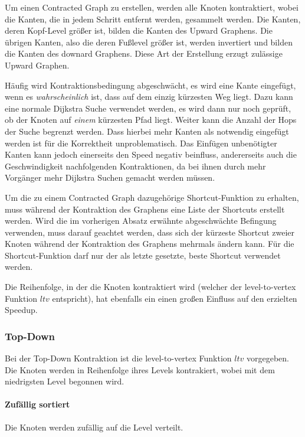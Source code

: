 Um einen Contracted Graph zu erstellen, werden alle Knoten kontraktiert, wobei die Kanten, die in jedem Schritt entfernt werden, gesammelt werden.
Die Kanten, deren Kopf-Level größer ist, bilden die Kanten des Upward Graphens.
Die übrigen Kanten, also die deren Fußlevel größer ist, werden invertiert und bilden die Kanten des downard Graphens.
Diese Art der Erstellung erzugt zulässige Upward Graphen.

Häufig wird Kontraktionsbedingung abgeschwächt, es wird eine Kante eingefügt, wenn es \emph{wahrscheinlich} ist, dass auf dem einzig kürzesten Weg liegt.
Dazu kann eine normale Dijkstra Suche verwendet werden, es wird dann nur noch geprüft, ob der Knoten auf \emph{einem} kürzesten Pfad liegt.
Weiter kann die Anzahl der Hops der Suche begrenzt werden.
Dass hierbei mehr Kanten als notwendig eingefügt werden ist für die Korrektheit unproblematisch.
Das Einfügen unbenötigter Kanten kann jedoch einerseits den Speed negativ beinfluss, andererseits auch die Geschwindigkeit nachfolgenden Kontraktionen, da bei ihnen durch mehr Vorgänger mehr Dijkstra Suchen gemacht werden müssen.

Um die zu einem Contracted Graph dazugehörige Shortcut-Funktion zu erhalten, muss während der Kontraktion des Graphens eine Liste der Shortcuts erstellt werden.
Wird die im vorherigen Absatz erwähnte abgeschwächte Befingung verwenden, muss darauf geachtet werden, dass sich der kürzeste Shortcut zweier Knoten während der Kontraktion des Graphens mehrmals ändern kann.
Für die Shortcut-Funktion darf nur der als letzte gesetzte, beste Shortcut verwendet werden.

Die Reihenfolge, in der die Knoten kontraktiert wird (welcher der level-to-vertex Funktion ${ltv}$ entspricht), hat ebenfalls ein einen großen Einfluss auf den erzielten Speedup.

\subsubsection{Top-Down}

Bei der Top-Down Kontraktion ist die level-to-vertex Funktion ${ltv}$ vorgegeben.
Die Knoten werden in Reihenfolge ihres Levels kontrakiert, wobei mit dem niedrigsten Level begonnen wird.

\paragraph{Zufällig sortiert}
Die Knoten werden zufällig auf die Level verteilt. 

